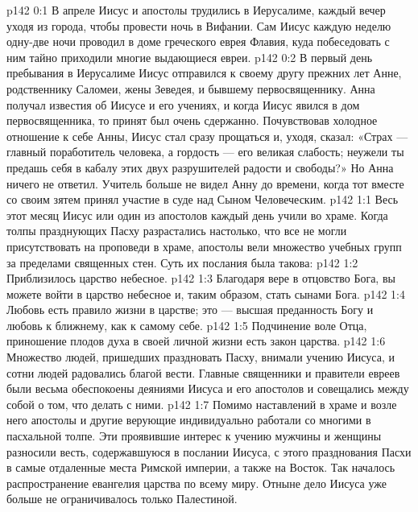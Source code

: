 \author{Комиссия срединников}
\vs p142 0:1 В апреле Иисус и апостолы трудились в Иерусалиме, каждый вечер уходя из города, чтобы провести ночь в Вифании. Сам Иисус каждую неделю одну\hyp{}две ночи проводил в доме греческого еврея Флавия, куда побеседовать с ним тайно приходили многие выдающиеся евреи.
\vs p142 0:2 \pc В первый день пребывания в Иерусалиме Иисус отправился к своему другу прежних лет Анне, родственнику Саломеи, жены Зеведея, и бывшему первосвященнику. Анна получал известия об Иисусе и его учениях, и когда Иисус явился в дом первосвященника, то принят был очень сдержанно. Почувствовав холодное отношение к себе Анны, Иисус стал сразу прощаться и, уходя, сказал: «Страх --- главный поработитель человека, а гордость --- его великая слабость; неужели ты предашь себя в кабалу этих двух разрушителей радости и свободы?» Но Анна ничего не ответил. Учитель больше не видел Анну до времени, когда тот вместе со своим зятем принял участие в суде над Сыном Человеческим.
\vs p142 1:1 Весь этот месяц Иисус или один из апостолов каждый день учили во храме. Когда толпы празднующих Пасху разрастались настолько, что все не могли присутствовать на проповеди в храме, апостолы вели множество учебных групп за пределами священных стен. Суть их послания была такова:
\vs p142 1:2 \bibnobreakspace Приблизилось царство небесное.
\vs p142 1:3 \bibnobreakspace Благодаря вере в отцовство Бога, вы можете войти в царство небесное и, таким образом, стать сынами Бога.
\vs p142 1:4 \bibnobreakspace Любовь есть правило жизни в царстве; это --- высшая преданность Богу и любовь к ближнему, как к самому себе.
\vs p142 1:5 \bibnobreakspace Подчинение воле Отца, приношение плодов духа в своей личной жизни есть закон царства.
\vs p142 1:6 \pc Множество людей, пришедших праздновать Пасху, внимали учению Иисуса, и сотни людей радовались благой вести. Главные священники и правители евреев были весьма обеспокоены деяниями Иисуса и его апостолов и совещались между собой о том, что делать с ними.
\vs p142 1:7 Помимо наставлений в храме и возле него апостолы и другие верующие индивидуально работали со многими в пасхальной толпе. Эти проявившие интерес к учению мужчины и женщины разносили весть, содержавшуюся в послании Иисуса, с этого празднования Пасхи в самые отдаленные места Римской империи, а также на Восток. Так началось распространение евангелия царства по всему миру. Отныне дело Иисуса уже больше не ограничивалось только Палестиной.
